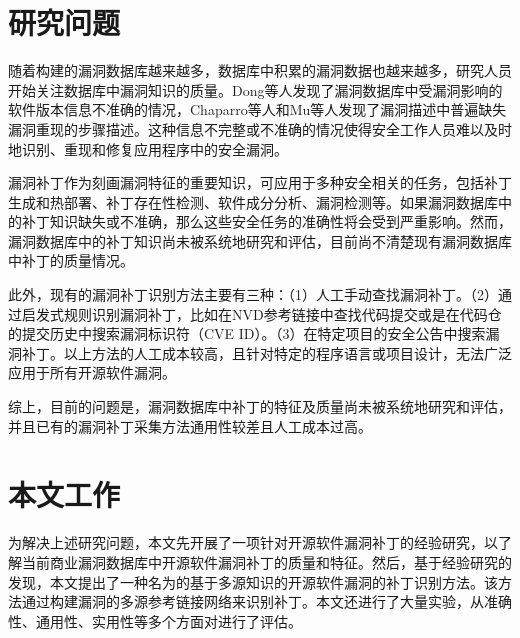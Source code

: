 \section{研究问题}
随着构建的漏洞数据库越来越多，数据库中积累的漏洞数据也越来越多，研究人员开始关注数据库中漏洞知识的质量。Dong等人\cite{dong2019towards}发现了漏洞数据库中受漏洞影响的软件版本信息不准确的情况，Chaparro等人\cite{chaparro2017detecting}和Mu等人\cite{mu2018understanding}发现了漏洞描述中普遍缺失漏洞重现的步骤描述。这种信息不完整或不准确的情况使得安全工作人员难以及时地识别、重现和修复应用程序中的安全漏洞。

漏洞补丁作为刻画漏洞特征的重要知识，可应用于多种安全相关的任务，包括补丁生成和热部署\cite{mulliner2013patchdroid,duan2019automating,xu2020automatic}、补丁存在性检测\cite{zhang2018precise,jiang2020pdiff,dai2020bscout}、软件成分分析\cite{ponta2020detection,pashchenko2020vuln4real,Wang2020empirical}、漏洞检测\cite{li2016vulpecker,li2018vuldeepecker,jang2012redebug,kim2017vuddy, xiao2020mvp, cui2020vuldetector}等。如果漏洞数据库中的补丁知识缺失或不准确，那么这些安全任务的准确性将会受到严重影响。然而，漏洞数据库中的补丁知识尚未被系统地研究和评估，目前尚不清楚现有漏洞数据库中补丁的质量情况。

此外，现有的漏洞补丁识别方法主要有三种：（1）人工手动查找漏洞补丁\cite{xu2020automatic,jiang2020pdiff,dai2020bscout,zhou2017automated,sabetta2018practical,chen2020machine,xiao2020mvp,ponta2020detection,pashchenko2020vuln4real}。（2）通过启发式规则识别漏洞补丁，比如在NVD参考链接中查找代码提交\cite{duan2019automating,li2016vulpecker}或是在代码仓的提交历史中搜索漏洞标识符（CVE ID）\cite{you2017semfuzz,Wang2020empirical}。（3）在特定项目的安全公告中搜索漏洞补丁\cite{mulliner2013patchdroid,jang2012redebug,kim2017vuddy}。以上方法的人工成本较高，且针对特定的程序语言或项目设计，无法广泛应用于所有开源软件漏洞。

综上，目前的问题是，漏洞数据库中补丁的特征及质量尚未被系统地研究和评估，并且已有的漏洞补丁采集方法通用性较差且人工成本过高。

\section{本文工作}
为解决上述研究问题，本文先开展了一项针对开源软件漏洞补丁的经验研究，以了解当前商业漏洞数据库中开源软件漏洞补丁的质量和特征。然后，基于经验研究的发现，本文提出了一种名为\tool 的基于多源知识的开源软件漏洞的补丁识别方法。该方法通过构建漏洞的多源参考链接网络来识别补丁。本文还进行了大量实验，从准确性、通用性、实用性等多个方面对\tool 进行了评估。


